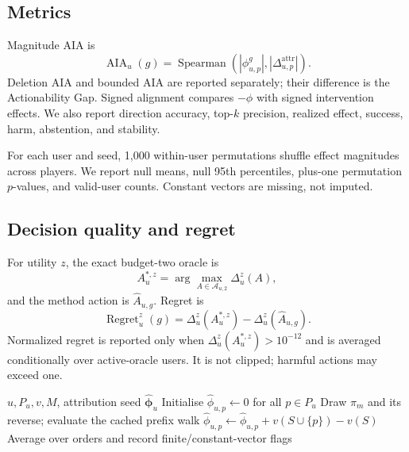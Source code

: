 \documentclass[pdflatex,sn-basic,Numbered]{sn-jnl}
\newcommand{\AIA}{\operatorname{AIA}}
\begin{document}
\subsection{Metrics}
Magnitude AIA is
\begin{equation}
\AIA_u(g)=\operatorname{Spearman}(|\phi^g_{u,p}|,|\Delta^{\mathrm{attr}}_{u,p}|).
\end{equation}
Deletion AIA and bounded AIA are reported separately; their difference is the Actionability Gap. Signed alignment compares $-\phi$ with signed intervention effects. We also report direction accuracy, top-$k$ precision, realized effect, success, harm, abstention, and stability.

For each user and seed, 1,000 within-user permutations shuffle effect magnitudes across players. We report null means, null 95th percentiles, plus-one permutation $p$-values, and valid-user counts. Constant vectors are missing, not imputed.

\subsection{Decision quality and regret}
For utility $z$, the exact budget-two oracle is
\begin{equation}
A_u^{*,z}=\arg\max_{A\in\mathcal A_{u,2}}\Delta_u^z(A),
\end{equation}
and the method action is $\widehat A_{u,g}$. Regret is
\begin{equation}
\operatorname{Regret}_u^z(g)=\Delta_u^z(A_u^{*,z})-\Delta_u^z(\widehat A_{u,g}).
\end{equation}
Normalized regret is reported only when $\Delta_u^z(A_u^{*,z})>10^{-12}$ and is averaged conditionally over active-oracle users. It is not clipped; harmful actions may exceed one.

\begin{algorithm}[t]
\caption{Paired Monte Carlo attribution}
\label{alg:shapley}
\begin{algorithmic}[1]
\Require $u,P_u,v,M$, attribution seed
\Ensure $\widehat{\boldsymbol\phi}_u$
\State Initialise $\hat\phi_{u,p}\gets0$ for all $p\in P_u$
\State Draw $\pi_m$ and its reverse; evaluate the cached prefix walk
\State $\hat\phi_{u,p}\gets\hat\phi_{u,p}+v(S\cup\{p\})-v(S)$
\EndFor
\EndFor
\State Average over orders and record finite/constant-vector flags
\end{algorithmic}
\end{algorithm}
\end{document}
